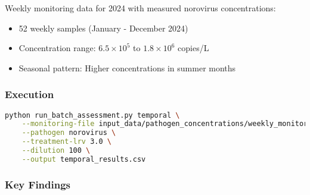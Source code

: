 \documentclass[11pt,a4paper]{article}
\begin{document}
Weekly monitoring data for 2024 with measured norovirus concentrations:
\begin{itemize}[leftmargin=*]
    \item 52 weekly samples (January - December 2024)
    \item Concentration range: $6.5 \times 10^5$ to $1.8 \times 10^6$ copies/L
    \item Seasonal pattern: Higher concentrations in summer months
\end{itemize}

\subsubsection{Execution}

\begin{lstlisting}[style=bashstyle, language=bash]
python run_batch_assessment.py temporal \
    --monitoring-file input_data/pathogen_concentrations/weekly_monitoring_2024.csv \
    --pathogen norovirus \
    --treatment-lrv 3.0 \
    --dilution 100 \
    --output temporal_results.csv
\end{lstlisting}

\subsubsection{Key Findings}
\end{document}
